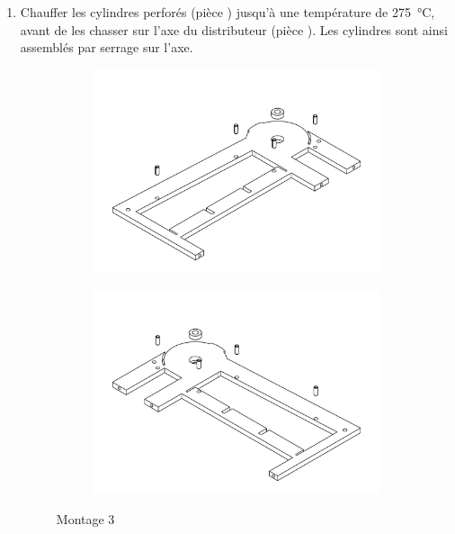 \begin{enumerate}
\item  Chauffer les cylindres perforés (pièce ) jusqu'à une température de \SI{275}{\degreeCelsius}, avant de les chasser sur l'axe du distributeur (pièce ). Les cylindres sont ainsi assemblés par serrage sur l'axe.

\newpage

\begin{figure}
    \centering
    \begin{subfigure}[h]{0.45\linewidth}
        \includegraphics[width=\linewidth]{Graphics/Montage/3A.pdf}
    \end{subfigure}
    \hfill
    \begin{subfigure}[h]{0.45\linewidth}
        \includegraphics[width=\linewidth]{Graphics/Montage/3B.pdf}
    \end{subfigure}
    \caption{Montage 3}
    \label{fig:Montage3}
\end{figure}


\end{enumerate}

